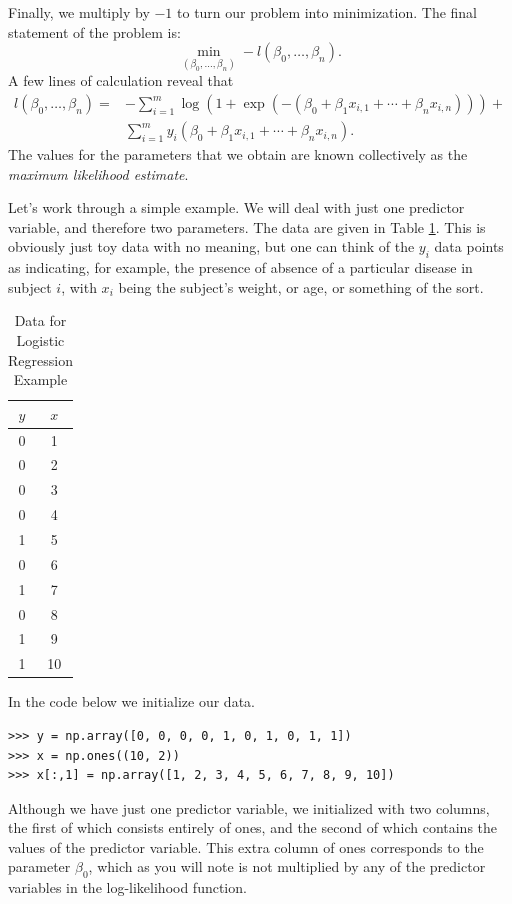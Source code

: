 Finally, we multiply by $-1$ to turn our problem into minimization. The final statement of the problem is:
$$
\min_{(\beta_0,\ldots,\beta_n)}-l(\beta_0, \ldots, \beta_n).
$$
A few lines of calculation reveal that
\begin{align*}
l(\beta_0,\ldots,\beta_n) = &-\sum_{i=1}^{m}\log(1+\exp(-(\beta_0 + \beta_1x_{i,1} + \cdots +\beta_nx_{i,n}))) +\\
 &\sum_{i=1}^m y_i(\beta_0 + \beta_1x_{i,1} + \cdots + \beta_nx_{i,n}).
\end{align*}
The values for the parameters that we obtain are known collectively as the \emph{maximum likelihood estimate}.

Let's work through a simple example. We will deal with just one predictor variable, and therefore two parameters.
The data are given in Table \ref{table:data}.
This is obviously just toy data with no meaning, but one can think of the $y_i$ data points as indicating, for example, the
presence of absence of a particular disease in subject $i$, with $x_i$ being the subject's weight, or age, or something
of the sort.

\begin{table}
  \caption{Data for Logistic Regression Example}
  \centering
  \begin{tabular}{c c}
    \hline\hline
    $y$ & $x$\\
    \hline
    0 & 1 \\
    0 & 2 \\
    0 & 3 \\
    0 & 4 \\
    1 & 5 \\
    0 & 6 \\
    1 & 7 \\
    0 & 8 \\
    1 & 9 \\
    1 & 10\\
    \hline
  \end{tabular}
  \label{table:data}
\end{table}

In the code below we initialize our data.
\begin{lstlisting}
>>> y = np.array([0, 0, 0, 0, 1, 0, 1, 0, 1, 1])
>>> x = np.ones((10, 2))
>>> x[:,1] = np.array([1, 2, 3, 4, 5, 6, 7, 8, 9, 10])
\end{lstlisting}
Although we have just one predictor variable, we initialized  with two columns,
the first of which consists entirely of ones, and the second of which contains the values of the
predictor variable. This extra column of ones corresponds to the parameter $\beta_0$, which as you
will note is not multiplied by any of the predictor variables in the log-likelihood function.

